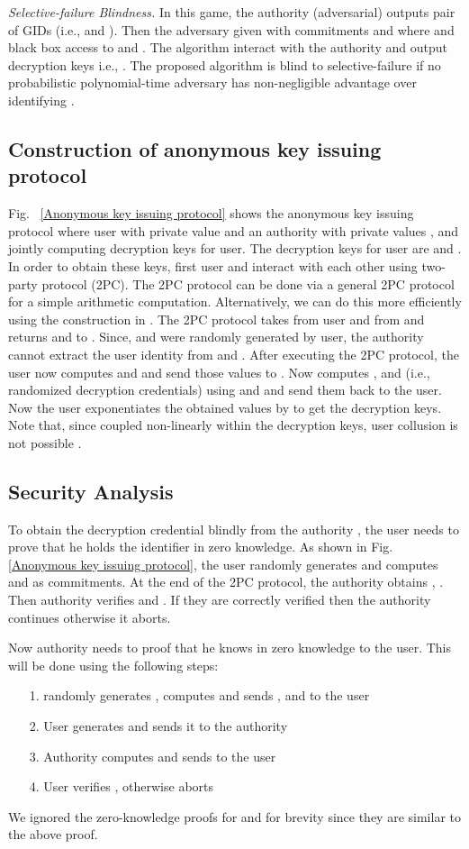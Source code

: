 \documentclass[10pt,journal]{IEEEtran}
\begin{document}
\textit{Selective-failure Blindness.} In this game, the authority (adversarial) outputs pair of GIDs (i.e.,  and ). Then the adversary given with commitments  and  where  and black box access to  and . The algorithm  interact with the authority and output decryption keys i.e., . The proposed algorithm is blind to selective-failure if no probabilistic polynomial-time adversary has non-negligible advantage over identifying .

\subsection{Construction of anonymous key issuing protocol}


Fig.~ \ref{Anonymous key issuing protocol} shows the anonymous key issuing protocol where user with private value  and an authority  with private values ,  and   jointly computing decryption keys for user. The decryption keys for user  are  and  . In order to obtain these keys, first user and  interact with each other using two-party protocol (2PC). The 2PC protocol can be done via a general 2PC protocol for a simple arithmetic computation. Alternatively, we can do this more efficiently using the construction in \cite{2PC1}. The 2PC protocol takes  from user and  from  and returns  and  to . Since,  and  were randomly generated by user, the authority  cannot extract the user identity  from  and . After executing the 2PC protocol, the user now computes  and  and send those values to . Now  computes ,  and  (i.e., randomized decryption credentials) using  and  and send them back to the user. Now the user exponentiates the obtained values by  to get the decryption keys. Note that, since   coupled non-linearly within the decryption keys,  user collusion is not possible \cite{imaabe}.


\subsection{Security Analysis}
To obtain the decryption credential blindly from the authority  , the user needs to prove that he holds the identifier  in zero knowledge. As shown in Fig.~ \ref{Anonymous key issuing protocol}, the user randomly generates  and computes  and  as commitments. At the end of the 2PC protocol, the authority obtains , . Then authority verifies  and . If they are correctly verified then the authority continues otherwise it aborts.

Now authority needs to proof that he knows  in zero knowledge to the user. This will be done using the following steps:
\begin{enumerate}
  \item[1.]  randomly generates , computes  and sends , and  to the user
  \item[2.] User generates  and sends it to the authority
  \item[3.] Authority computes  and sends  to the user
  \item[4.] User verifies , otherwise aborts
\end{enumerate}
We ignored the zero-knowledge proofs for   and  for brevity since they are similar to the above proof.\\
\end{document}
